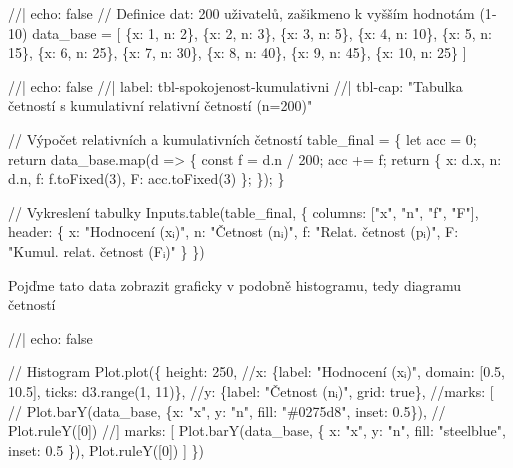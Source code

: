 \documentclass[
  czech,
  11pt,
  letterpaper,
  DIV=11,
  numbers=noendperiod]{scrreprt}
\newenvironment{Shaded}{\begin{snugshade}}{\end{snugshade}}
\newcommand{\NormalTok}[1]{\textcolor[rgb]{0.00,0.23,0.31}{#1}}
\begin{document}
\begin{Shaded}
\begin{Highlighting}[]
\NormalTok{//| echo: false}
\NormalTok{// Definice dat: 200 uživatelů, zašikmeno k vyšším hodnotám (1{-}10)}
\NormalTok{data\_base = [}
\NormalTok{  \{x: 1,  n: 2\},}
\NormalTok{  \{x: 2,  n: 3\},}
\NormalTok{  \{x: 3,  n: 5\},}
\NormalTok{  \{x: 4,  n: 10\},}
\NormalTok{  \{x: 5,  n: 15\},}
\NormalTok{  \{x: 6,  n: 25\},}
\NormalTok{  \{x: 7,  n: 30\},}
\NormalTok{  \{x: 8,  n: 40\},}
\NormalTok{  \{x: 9,  n: 45\},}
\NormalTok{  \{x: 10, n: 25\}}
\NormalTok{]}
\end{Highlighting}
\end{Shaded}

\begin{Shaded}
\begin{Highlighting}[]
\NormalTok{//| echo: false}
\NormalTok{//| label: tbl{-}spokojenost{-}kumulativni}
\NormalTok{//| tbl{-}cap: "Tabulka četností s kumulativní relativní četností (n=200)"}

\NormalTok{// Výpočet relativních a kumulativních četností}
\NormalTok{table\_final = \{}
\NormalTok{  let acc = 0;}
\NormalTok{  return data\_base.map(d =\textgreater{} \{}
\NormalTok{    const f = d.n / 200;}
\NormalTok{    acc += f;}
\NormalTok{    return \{}
\NormalTok{      x: d.x,}
\NormalTok{      n: d.n,}
\NormalTok{      f: f.toFixed(3),}
\NormalTok{      F: acc.toFixed(3)}
\NormalTok{    \};}
\NormalTok{  \});}
\NormalTok{\}}

\NormalTok{// Vykreslení tabulky}
\NormalTok{Inputs.table(table\_final, \{}
\NormalTok{  columns: ["x", "n", "f", "F"],}
\NormalTok{  header: \{}
\NormalTok{    x: "Hodnocení (xᵢ)",}
\NormalTok{    n: "Četnost (nᵢ)",}
\NormalTok{    f: "Relat. četnost (pᵢ)",}
\NormalTok{    F: "Kumul. relat. četnost (Fᵢ)"}
\NormalTok{  \}}
\NormalTok{\})}
\end{Highlighting}
\end{Shaded}

Pojďme tato data zobrazit graficky v podobně histogramu, tedy diagramu
četností

\begin{Shaded}
\begin{Highlighting}[]
\NormalTok{//| echo: false}

\NormalTok{// Histogram}
\NormalTok{Plot.plot(\{}
\NormalTok{  height: 250,}
\NormalTok{  //x: \{label: "Hodnocení (xᵢ)", domain: [0.5, 10.5], ticks: d3.range(1, 11)\},}
\NormalTok{  //y: \{label: "Četnost (nᵢ)", grid: true\},}
\NormalTok{  //marks: [}
\NormalTok{  //  Plot.barY(data\_base, \{x: "x", y: "n", fill: "\#0275d8", inset: 0.5\}),}
\NormalTok{  //  Plot.ruleY([0])}
\NormalTok{  //]}
\NormalTok{  marks: [}
\NormalTok{    Plot.barY(data\_base, \{}
\NormalTok{      x: "x", }
\NormalTok{      y: "n", }
\NormalTok{      fill: "steelblue",}
\NormalTok{      inset: 0.5 }
\NormalTok{    \}),}
\NormalTok{    Plot.ruleY([0])}
\NormalTok{  ]  }
\NormalTok{\})}
\end{Highlighting}
\end{Shaded}
\end{document}
